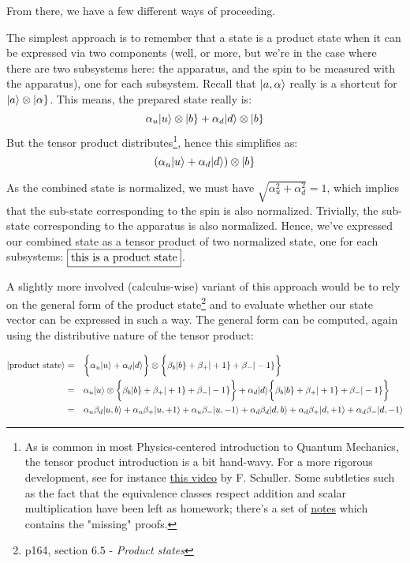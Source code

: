 \documentclass[solutions.tex]{subfiles}
\begin{document}
From there, we have a few different ways of proceeding.

\hr

The simplest approach is to remember that a state is a product state when it can
be expressed via two components (well, or more, but we're in the case where
there are two subsystems here: the apparatus, and the spin to be measured with the
apparatus), one for each subsystem. Recall that $|a,\alpha\rangle$ really is a shortcut
for $|a\rangle\otimes|\alpha\}$. This means, the prepared state really is:
\[
	\alpha_u|u\rangle\otimes|b\} + \alpha_d|d\rangle\otimes|b\}
\]
But the tensor product distributes\footnote{As is common in most Physics-centered
introduction to Quantum Mechanics, the tensor product introduction is a bit
hand-wavy. For a more rigorous development, see for instance
\href{https://www.youtube.com/watch?v=OZ1WCyJmjgo&list=PLPH7f_7ZlzxQVx5jRjbfRGEzWY_upS5K6&index=14&pp=iAQB}{this video} by F. Schuller. Some subtleties such as the
fact that the equivalence classes respect addition and scalar multiplication have
been left as homework; there's a set of
\href{https://drive.google.com/file/d/1I7rIH7Rtm0cCKVuLNeWfFMdKurX123x5/view}{notes}
which contains the "missing" proofs.}, hence this simplifies as:
\[
	\left(\alpha_u|u\rangle+\alpha_d|d\rangle\right)\otimes|b\}
\]

As the combined state is normalized, we must have
$\sqrt{\alpha_u^2+\alpha_d^2}=1$, which implies that the sub-state
corresponding to the spin is also normalized. Trivially, the sub-state
corresponding to the apparatus is also normalized. Hence, we've expressed
our combined state as a tensor product of two normalized state,
one for each subsystems: $\fbox{\text{this is a product state}}$. \\

\hr

A slightly more involved (calculus-wise) variant of this approach would be to
rely on the general form of the product state\footnote{p164, section $6.5$ -
\textit{Product states}} and to evaluate whether our state vector can be expressed
in such a way. The general form can be computed, again using the distributive
nature of the tensor product:

\begin{equation*}\begin{aligned}
	|\text{product state}\rangle &=&&
		\biggl\{\alpha_u|u\rangle+\alpha_d|d\rangle\biggr\}
		\otimes
		\biggl\{\beta_b|b\}+\beta_+|+1\}+\beta_-|-1\}\biggr\} \\
	~ &=&&
		\alpha_u|u\rangle\otimes\biggl\{
			\beta_b|b\}+\beta_+|+1\}+\beta_-|-1\}\biggr\}
		+\alpha_d|d\rangle\biggl\{
			\beta_b|b\}+\beta_+|+1\}+\beta_-|-1\}\biggr\} \\
	~ &=&&
		\alpha_u\beta_d|u,b\rangle+
		\alpha_u\beta_+|u,+1\rangle+
		\alpha_u\beta_-|u,-1\rangle+
		\alpha_d\beta_d|d,b\rangle+
		\alpha_d\beta_+|d,+1\rangle+
		\alpha_d\beta_-|d,-1\rangle
\end{aligned}\end{equation*}
\end{document}
